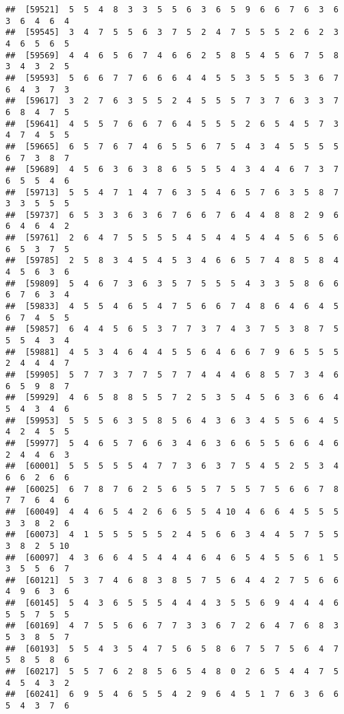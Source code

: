 \documentclass[
]{book}
\begin{document}
\begin{verbatim}
##  [59521]  5  5  4  8  3  3  5  5  6  3  6  5  9  6  6  7  6  3  6  3  6  4  6  4
##  [59545]  3  4  7  5  5  6  3  7  5  2  4  7  5  5  5  2  6  2  3  4  6  5  6  5
##  [59569]  4  4  6  5  6  7  4  6  6  2  5  8  5  4  5  6  7  5  8  3  4  3  2  5
##  [59593]  5  6  6  7  7  6  6  6  4  4  5  5  3  5  5  5  3  6  7  6  4  3  7  3
##  [59617]  3  2  7  6  3  5  5  2  4  5  5  5  7  3  7  6  3  3  7  6  8  4  7  5
##  [59641]  4  5  5  7  6  6  7  6  4  5  5  5  2  6  5  4  5  7  3  4  7  4  5  5
##  [59665]  6  5  7  6  7  4  6  5  5  6  7  5  4  3  4  5  5  5  5  6  7  3  8  7
##  [59689]  4  5  6  3  6  3  8  6  5  5  5  4  3  4  4  6  7  3  7  6  5  5  4  6
##  [59713]  5  5  4  7  1  4  7  6  3  5  4  6  5  7  6  3  5  8  7  3  3  5  5  5
##  [59737]  6  5  3  3  6  3  6  7  6  6  7  6  4  4  8  8  2  9  6  6  4  6  4  2
##  [59761]  2  6  4  7  5  5  5  5  4  5  4  4  5  4  4  5  6  5  6  6  5  3  7  5
##  [59785]  2  5  8  3  4  5  4  5  3  4  6  6  5  7  4  8  5  8  4  4  5  6  3  6
##  [59809]  5  4  6  7  3  6  3  5  7  5  5  5  4  3  3  5  8  6  6  6  7  6  3  4
##  [59833]  4  5  5  4  6  5  4  7  5  6  6  7  4  8  6  4  6  4  5  6  7  4  5  5
##  [59857]  6  4  4  5  6  5  3  7  7  3  7  4  3  7  5  3  8  7  5  5  5  4  3  4
##  [59881]  4  5  3  4  6  4  4  5  5  6  4  6  6  7  9  6  5  5  5  2  4  4  4  7
##  [59905]  5  7  7  3  7  7  5  7  7  4  4  4  6  8  5  7  3  4  6  6  5  9  8  7
##  [59929]  4  6  5  8  8  5  5  7  2  5  3  5  4  5  6  3  6  6  4  5  4  3  4  6
##  [59953]  5  5  5  6  3  5  8  5  6  4  3  6  3  4  5  5  6  4  5  4  2  4  5  5
##  [59977]  5  4  6  5  7  6  6  3  4  6  3  6  6  5  5  6  6  4  6  2  4  4  6  3
##  [60001]  5  5  5  5  5  4  7  7  3  6  3  7  5  4  5  2  5  3  4  6  6  2  6  6
##  [60025]  6  7  8  7  6  2  5  6  5  5  7  5  5  7  5  6  6  7  8  7  7  6  4  6
##  [60049]  4  4  6  5  4  2  6  6  5  5  4 10  4  6  6  4  5  5  5  3  3  8  2  6
##  [60073]  4  1  5  5  5  5  5  2  4  5  6  6  3  4  4  5  7  5  5  3  8  2  5 10
##  [60097]  4  3  6  6  4  5  4  4  4  6  4  6  5  4  5  5  6  1  5  3  5  5  6  7
##  [60121]  5  3  7  4  6  8  3  8  5  7  5  6  4  4  2  7  5  6  6  4  9  6  3  6
##  [60145]  5  4  3  6  5  5  5  4  4  4  3  5  5  6  9  4  4  4  6  5  5  7  5  5
##  [60169]  4  7  5  5  6  6  7  7  3  3  6  7  2  6  4  7  6  8  3  5  3  8  5  7
##  [60193]  5  5  4  3  5  4  7  5  6  5  8  6  7  5  7  5  6  4  7  5  8  5  8  6
##  [60217]  5  5  7  6  2  8  5  6  5  4  8  0  2  6  5  4  4  7  5  4  5  4  3  2
##  [60241]  6  9  5  4  6  5  5  4  2  9  6  4  5  1  7  6  3  6  6  5  4  3  7  6

\end{verbatim}
\end{document}
